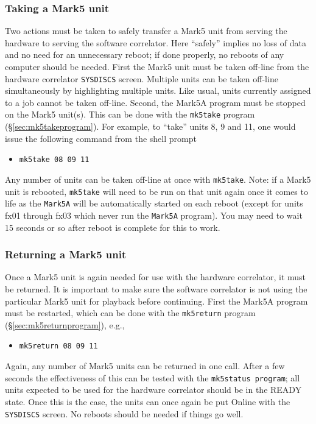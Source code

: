 \subsubsection{Taking a Mark5 unit} \label{sec:take}

Two actions must be taken to safely transfer a Mark5 unit from serving the hardware to serving the software correlator.
Here ``safely'' implies no loss of data and no need for an unnecessary reboot; if done properly, no reboots of any computer should be needed.
First the Mark5 unit must be taken off-line from the hardware correlator {\tt SYSDISCS} screen.
Multiple units can be taken off-line simultaneously by highlighting multiple units.
Like usual, units currently assigned to a job cannot be taken off-line.
Second, the Mark5A program must be stopped on the Mark5 unit(s).
This can be done with the {\tt mk5take} program (\S\ref{sec:mk5takeprogram}).
For example, to ``take'' units 8, 9 and 11, one would issue the following command from the shell prompt

\begin{itemize}
\item[] {\tt mk5take 08 09 11}
\end{itemize}

Any number of units can be taken off-line at once with {\tt mk5take}.
Note: if a Mark5 unit is rebooted, {\tt mk5take} will need to be run on that unit again once it comes to life as the {\tt Mark5A} will be automatically started on each reboot (except for units fx01 through fx03 which never run the {\tt Mark5A} program).
You may need to wait 15 seconds or so after reboot is complete for this to work.

\subsubsection{Returning a Mark5 unit} \label{sec:return}

Once a Mark5 unit is again needed for use with the hardware correlator, it must be returned.
It is important to make sure the software correlator is not using the particular Mark5 unit for playback before continuing.
First the Mark5A program must be restarted, which can be done with the {\tt mk5return} program (\S\ref{sec:mk5returnprogram}), e.g.,

\begin{itemize}
\item[] {\tt mk5return 08 09 11}
\end{itemize}

Again, any number of Mark5 units can be returned in one call.
After a few seconds the effectiveness of this can be tested with the {\tt mk5status program}; all units expected to be used for the hardware correlator should be in the READY state.
Once this is the case, the units can once again be put Online with the {\tt SYSDISCS} screen.
No reboots should be needed if things go well.



